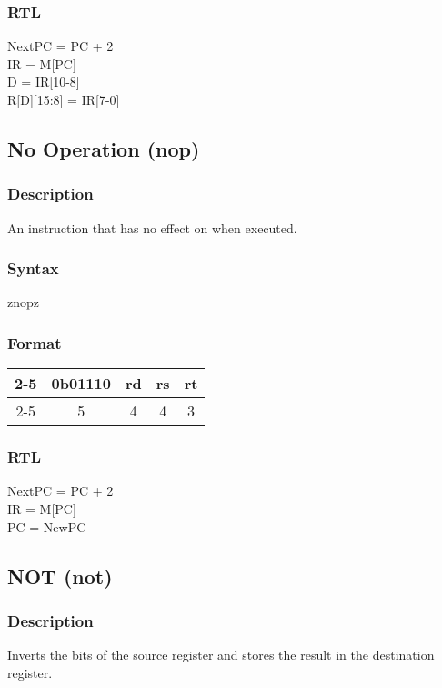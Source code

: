 \documentclass[12pt, a4paper]{report}
\begin{document}
	\subsubsection{RTL}
	NextPC = PC + 2 \\
	IR = M[PC] \\
	D = IR[10-8] \\
	R[D][15:8] = IR[7-0] \\
	
	\subsection{No Operation (nop)}
	\subsubsection{Description}
	An instruction that has no effect on when executed.
	\subsubsection{Syntax}
	znopz%
	\subsubsection{Format}
	\begin{center}
		{\renewcommand{\arraystretch}{1.5}
			\begin{tabular}[b]{c @{ } c | c | c | c|}
				\cline{2-5}
				& \vline \hspace{1.5pt} 0b01110 & rd & rs & rt \\
				\cline{2-5}
				\multicolumn{1}{}{} & \multicolumn{1}{c}{5} & \multicolumn{1}{c}{4}
				& \multicolumn{1}{c}{4} & \multicolumn{1}{c}{3}
		\end{tabular}}
	\end{center}
	\subsubsection{RTL}
	NextPC = PC + 2 \\
	IR = M[PC] \\
	PC = NewPC \\
	
	\subsection{NOT (not)}
	\subsubsection{Description}
	Inverts the bits of the source register and stores the result in the destination register.
\end{document}
